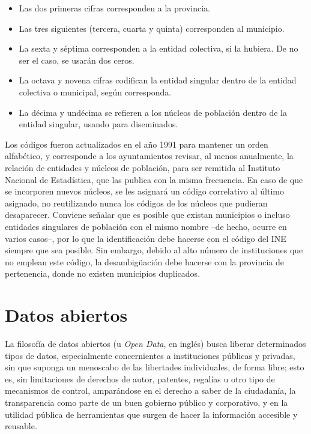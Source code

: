 \begin{itemize}
    \item Las dos primeras cifras corresponden a la provincia.
    \item Las tres siguientes (tercera, cuarta y quinta) corresponden al municipio.
    \item La sexta y séptima corresponden a la entidad colectiva, si la hubiera. De no ser el caso, se usarán dos ceros.
    \item La octava y novena cifras codifican la entidad singular dentro de la entidad colectiva o municipal, según corresponda.
    \item La décima y undécima se refieren a los núcleos de población dentro de la entidad singular, usando  \guillemotright\space para diseminados.
\end{itemize}

Los códigos fueron actualizados en el año 1991 para mantener un orden alfabético, y corresponde a los ayuntamientos revisar, al menos anualmente, la relación de entidades y núcleos de población, para ser remitida al Instituto Nacional de Estadística, que las publica con la misma frecuencia. En caso de que se incorporen nuevos núcleos, se les asignará un código correlativo al último asignado, no reutilizando nunca los códigos de los núcleos que pudieran desaparecer. Conviene señalar que es posible que existan municipios o incluso entidades singulares de población con el mismo nombre –de hecho, ocurre en varios casos–, por lo que la identificación debe hacerse con el código del INE siempre que sea posible. Sin embargo, debido al alto número de instituciones que no emplean este código, la desambigüación debe hacerse con la provincia de pertenencia, donde no existen municipios duplicados.

\section{Datos abiertos}

La filosofía de datos abiertos (u \textit{Open Data}, en inglés) busca liberar determinados tipos de datos, especialmente concernientes a instituciones públicas y privadas, sin que suponga un menoscabo de las libertades individuales, de forma libre; esto es, sin limitaciones de derechos de autor, patentes, regalías u otro tipo de mecanismos de control, amparándose en el derecho a saber de la ciudadanía, la transparencia como parte de un buen gobierno público y corporativo, y en la utilidad pública de herramientas que surgen de hacer la información accesible y reusable.~\cite{datos_abiertos}


